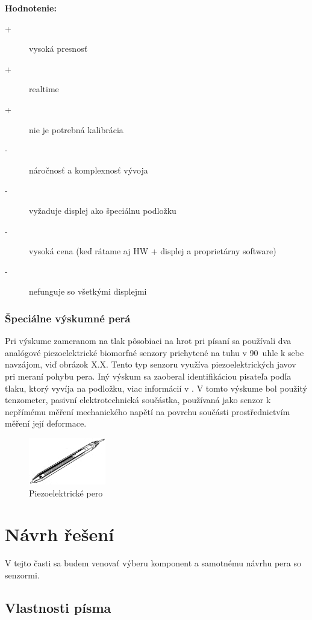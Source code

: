 \textbf{Hodnotenie:}
\begin{description}
	\item[+]{vysoká presnosť}
	\item[+]{realtime}
	\item[+]{nie je potrebná kalibrácia}
	\item[-]{náročnosť a komplexnosť vývoja}
	\item[-]{vyžaduje displej ako špeciálnu podložku}
	\item[-]{vysoká cena (keď rátame aj HW + displej a proprietárny software)}
	\item[-]{nefunguje so všetkými displejmi}
\end{description}

\subsection*{Špeciálne výskumné perá}

Pri výskume zameranom na tlak pôsobiaci na hrot pri písaní sa používali dva analógové piezoelektrické biomorfné senzory prichytené na tuhu v 90\degree~uhle k sebe navzájom\cite{EernisseE}, viď obrázok X.X. Tento typ senzoru využíva piezoelektrických javov pri meraní pohybu pera. Iný výskum sa zaoberal identifikáciou pisateľa podľa tlaku, ktorý vyvíja na podložku, viac informácií v \cite{SchomakerL.1990Trbp}. V tomto výskume bol použitý tenzometer, pasivní elektrotechnická součástka, používaná jako senzor k nepřímému měření mechanického napětí na povrchu součásti prostřednictvím měření její deformace\cite{Tenzometr}.

\begin{figure}[hbt]
	\centering
	\includegraphics[width=0.3\textwidth]{obrazky-figures/piezoPen1997.png}
	\caption{Piezoelektrické pero}
	\label{piezoPen1997}
\end{figure}

\chapter{Návrh řešení}

V tejto časti sa budem venovať výberu komponent a samotnému návrhu pera so senzormi.

\section{Vlastnosti písma}

